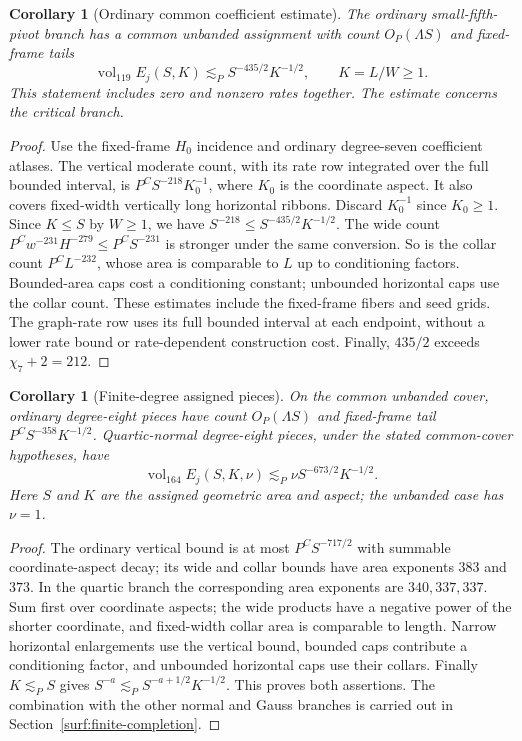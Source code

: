 \documentclass[11pt]{amsart}
\newtheorem{corollary}[theorem]{Corollary}
\theoremstyle{definition}
\theoremstyle{remark}
\numberwithin{equation}{section}
\begin{document}
\begin{corollary}[Ordinary common coefficient estimate]\label{low:78:s7c:ordinary-tail}
The ordinary small-fifth-pivot branch has a common unbanded assignment with count $O_P(\Lambda S)$ and fixed-frame tails
\[
\operatorname{vol}_{119} E_j(S,K)\lesssim_P S^{-435/2}K^{-1/2},\qquad K=L/W\ge1.
\]
This statement includes zero and nonzero rates together. The estimate concerns the critical branch.
\end{corollary}

\begin{proof}
Use the fixed-frame $H_0$ incidence and ordinary degree-seven coefficient atlases. The vertical moderate count, with its rate row integrated over the full bounded interval, is $P^C S^{-218}K_0^{-1}$, where $K_0$ is the coordinate aspect. It also covers fixed-width vertically long horizontal ribbons. Discard $K_0^{-1}$ since $K_0\ge1$. Since $K\le S$ by $W\ge1$, we have $S^{-218}\le S^{-435/2}K^{-1/2}$. The wide count $P^Cw^{-231}H^{-279}\le P^CS^{-231}$ is stronger under the same conversion. So is the collar count $P^CL^{-232}$, whose area is comparable to $L$ up to conditioning factors. Bounded-area caps cost a conditioning constant; unbounded horizontal caps use the collar count. These estimates include the fixed-frame fibers and seed grids. The graph-rate row uses its full bounded interval at each endpoint, without a lower rate bound or rate-dependent construction cost. Finally, $435/2$ exceeds $\chi_7+2=212$.
\end{proof}


\begin{corollary}[Finite-degree assigned pieces]\label{low:78:s38o:common}
On the common unbanded cover, ordinary degree-eight pieces have count $O_P(\Lambda S)$ and fixed-frame tail $P^CS^{-358}K^{-1/2}$. Quartic-normal degree-eight pieces, under the stated common-cover hypotheses, have
\begin{equation}\label{low:78:d8q:assigned-tail}
\operatorname{vol}_{164}E_j(S,K,\nu)\lesssim_P\nu S^{-673/2}K^{-1/2}.
\end{equation}
Here $S$ and $K$ are the assigned geometric area and aspect; the unbanded case has $\nu=1$.
\end{corollary}
\begin{proof}
The ordinary vertical bound is at most $P^CS^{-717/2}$ with summable coordinate-aspect decay; its wide and collar bounds have area exponents $383$ and $373$. In the quartic branch the corresponding area exponents are $340,337,337$. Sum first over coordinate aspects; the wide products have a negative power of the shorter coordinate, and fixed-width collar area is comparable to length. Narrow horizontal enlargements use the vertical bound, bounded caps contribute a conditioning factor, and unbounded horizontal caps use their collars. Finally $K\lesssim_PS$ gives $S^{-a}\lesssim_PS^{-a+1/2}K^{-1/2}$. This proves both assertions. The combination with the other normal and Gauss branches is carried out in Section~\ref{surf:finite-completion}.
\end{proof}
\end{document}
